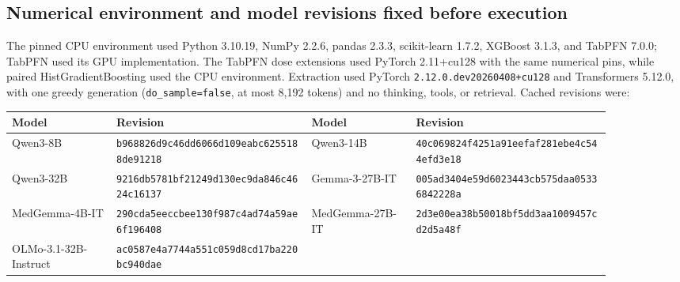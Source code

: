 
\subsection{Numerical environment and model revisions fixed before execution}

The pinned CPU environment used Python 3.10.19, NumPy 2.2.6, pandas 2.3.3,
scikit-learn 1.7.2, XGBoost 3.1.3, and TabPFN 7.0.0; TabPFN used its GPU
implementation.  The TabPFN dose extensions used PyTorch 2.11+cu128 with the
same numerical pins, while paired HistGradientBoosting used the CPU
environment.  Extraction used PyTorch \texttt{2.12.0.dev20260408+cu128} and
Transformers 5.12.0, with one greedy generation (\texttt{do\_sample=false}, at
most 8,192 tokens) and no thinking, tools, or retrieval.  Cached revisions were:

\begin{center}
\scriptsize
\setlength{\tabcolsep}{3pt}
\begin{tabular}{P{0.15\linewidth}P{0.29\linewidth}P{0.15\linewidth}P{0.29\linewidth}}
\toprule
Model & Revision & Model & Revision \\
\midrule
Qwen3-8B & \texttt{b968826d9c46dd6066d1}\newline\texttt{09eabc6255188de91218} & Qwen3-14B & \texttt{40c069824f4251a91eef}\newline\texttt{af281ebe4c544efd3e18} \\
Qwen3-32B & \texttt{9216db5781bf21249d13}\newline\texttt{0ec9da846c4624c16137} & Gemma-3-27B-IT & \texttt{005ad3404e59d6023443}\newline\texttt{cb575daa05336842228a} \\
MedGemma-4B-IT & \texttt{290cda5eeccbee130f987}\newline\texttt{c4ad74a59ae6f196408} & MedGemma-27B-IT & \texttt{2d3e00ea38b50018bf5d}\newline\texttt{d3aa1009457cd2d5a48f} \\
OLMo-3.1-32B-Instruct & \texttt{ac0587e4a7744a551c05}\newline\texttt{9d8cd17ba220bc940dae} & & \\
\bottomrule
\end{tabular}
\end{center}

